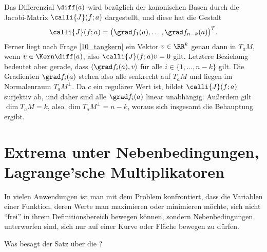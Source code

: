 \begin{antwort}
  Das Differenzial $\diff (a)$ wird bezüglich der kanonischen Basen 
  durch die Jacobi-Matrix $\calli{J}(f;a)$ dargestellt, und diese 
  hat die Gestalt 
  \[
  \calli{J}(f;a) = \big( \grad f_1(a), \ldots, \grad f_{n-k} (a) \big)^T.
  \]  
  Ferner liegt nach Frage \ref{10_tangkern} ein Vektor $v\in\RR^k$ genau 
  dann in $T_a M$, wenn $v\in \Kern \diff(a)$, also 
  $\calli{J}( f;a ) v =0$ gilt. Letztere Beziehung bedeutet aber 
  gerade, dass 
  $\langle  \grad f_i(a), v \rangle$ für alle $i \in \{ 1, \ldots, n-k \}$ 
  gilt. Die Gradienten $\grad f_i(a)$ stehen also alle senkrecht auf $T_aM$ 
  und liegen im Normalenraum $T_aM^\perp$. 
  Da $c$ ein regulärer Wert ist, bildet $\calli{J}(f;a)$ surjektiv ab, und 
  daher sind alle $\grad f_i (a)$ linear unabhängig. Außerdem gilt 
  $\dim T_aM=k$, also $\dim T_aM^\perp = n-k$, 
  woraus sich insgesamt die Behauptung ergibt. \AntEnd
\end{antwort}

\section{Extrema unter Nebenbedingungen, Lagrange'sche Multiplikatoren}

In vielen Anwendungen ist man mit dem Problem konfrontiert, dass 
die Variablen einer Funktion, deren Werte man maximieren 
oder minimieren möchte, sich nicht "`frei"' in ihrem Definitionsbereich 
bewegen können, sondern Nebenbedingungen unterworfen sind, {\zB} sich 
nur auf einer Kurve oder Fläche bewegen zu dürfen.

\begin{frage}
  Was besagt der Satz über die 
  ?
\end{frage}

